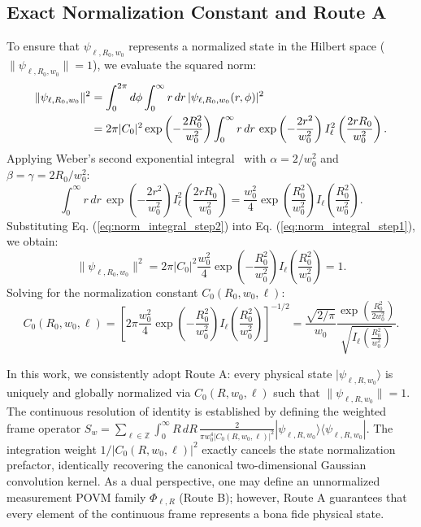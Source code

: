 \documentclass[11pt,a4paper]{article}
\begin{document}
\subsection{Exact Normalization Constant and Route A}

To ensure that $\psi_{\ell, R_0, w_0}$ represents a normalized state in the Hilbert space ($\|\psi_{\ell, R_0, w_0}\| = 1$), we evaluate the squared norm:
\begin{align}
\|\psi_{\ell, R_0, w_0}\|^2 &= \int_0^{2\pi} d\phi \int_0^\infty r \, dr \, |\psi_{\ell, R_0, w_0}(r, \phi)|^2 \notag \\
&= 2\pi |C_0|^2 \exp\left( - \frac{2 R_0^2}{w_0^2} \right) \int_0^\infty r \, dr \, \exp\left( - \frac{2 r^2}{w_0^2} \right) I_\ell^2\left( \frac{2 r R_0}{w_0^2} \right).
\label{eq:norm_integral_step1}
\end{align}
Applying Weber's second exponential integral~\cite{Gradshteyn2014} with $\alpha = 2 / w_0^2$ and $\beta = \gamma = 2 R_0 / w_0^2$:
\begin{equation}
\int_0^\infty r \, dr \, \exp\left( - \frac{2 r^2}{w_0^2} \right) I_\ell^2\left( \frac{2 r R_0}{w_0^2} \right) = \frac{w_0^2}{4} \exp\left( \frac{R_0^2}{w_0^2} \right) I_\ell\left( \frac{R_0^2}{w_0^2} \right).
\label{eq:norm_integral_step2}
\end{equation}
Substituting Eq. (\ref{eq:norm_integral_step2}) into Eq. (\ref{eq:norm_integral_step1}), we obtain:
\begin{equation}
\|\psi_{\ell, R_0, w_0}\|^2 = 2\pi |C_0|^2 \frac{w_0^2}{4} \exp\left( - \frac{R_0^2}{w_0^2} \right) I_\ell\left( \frac{R_0^2}{w_0^2} \right) = 1.
\label{eq:norm_integral_step3}
\end{equation}
Solving for the normalization constant $C_0(R_0, w_0, \ell)$:
\begin{equation}
\boxed{C_0(R_0, w_0, \ell) = \left[ 2\pi \frac{w_0^2}{4} \exp\left( - \frac{R_0^2}{w_0^2} \right) I_\ell\left( \frac{R_0^2}{w_0^2} \right) \right]^{-1/2} = \frac{\sqrt{2/\pi}}{w_0} \frac{\exp\left( \frac{R_0^2}{2 w_0^2} \right)}{\sqrt{I_\ell\left( \frac{R_0^2}{w_0^2} \right)}}.}
\label{eq:exact_normalization_constant}
\end{equation}

In this work, we consistently adopt Route A: every physical state $|\psi_{\ell, R, w_0}\rangle$ is uniquely and globally normalized via $C_0(R, w_0, \ell)$ such that $\|\psi_{\ell, R, w_0}\| = 1$. The continuous resolution of identity is established by defining the weighted frame operator $S_w = \sum_{\ell \in \mathbb{Z}} \int_0^\infty R \, dR \, \frac{2}{\pi w_0^4 |C_0(R, w_0, \ell)|^2} |\psi_{\ell, R, w_0}\rangle \langle \psi_{\ell, R, w_0}|$. The integration weight $1/|C_0(R, w_0, \ell)|^2$ exactly cancels the state normalization prefactor, identically recovering the canonical two-dimensional Gaussian convolution kernel. As a dual perspective, one may define an unnormalized measurement POVM family $\Phi_{\ell, R}$ (Route B); however, Route A guarantees that every element of the continuous frame represents a bona fide physical state.
\end{document}
